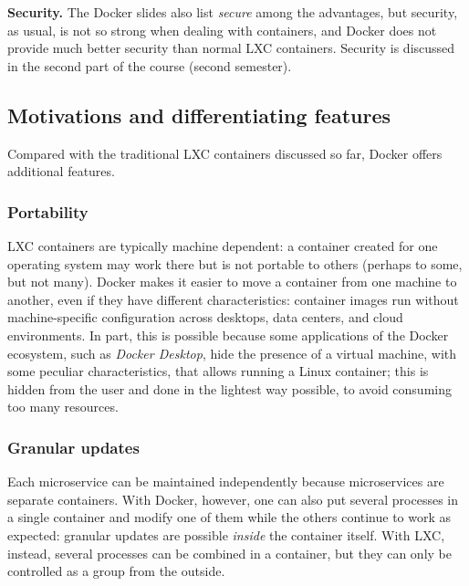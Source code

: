 \begin{notebox}
	\textbf{Security.} The Docker slides also list \emph{secure} among the advantages, but security, as usual, is not so strong when dealing with containers, and Docker does not provide much better security than normal LXC containers. Security is discussed in the second part of the course (second semester).
\end{notebox}

\subsection{Motivations and differentiating features}

Compared with the traditional LXC containers discussed so far, Docker offers additional features.

\subsubsection*{Portability}

LXC containers are typically machine dependent: a container created for one operating system may work there but is not portable to others (perhaps to some, but not many). Docker makes it easier to move a container from one machine to another, even if they have different characteristics: container images run without machine-specific configuration across desktops, data centers, and cloud environments. In part, this is possible because some applications of the Docker ecosystem, such as \emph{Docker Desktop}, hide the presence of a virtual machine, with some peculiar characteristics, that allows running a Linux container; this is hidden from the user and done in the lightest way possible, to avoid consuming too many resources.

\subsubsection*{Granular updates}

Each microservice can be maintained independently because microservices are separate containers. With Docker, however, one can also put several processes in a single container and modify one of them while the others continue to work as expected: granular updates are possible \emph{inside} the container itself. With LXC, instead, several processes can be combined in a container, but they can only be controlled as a group from the outside.


